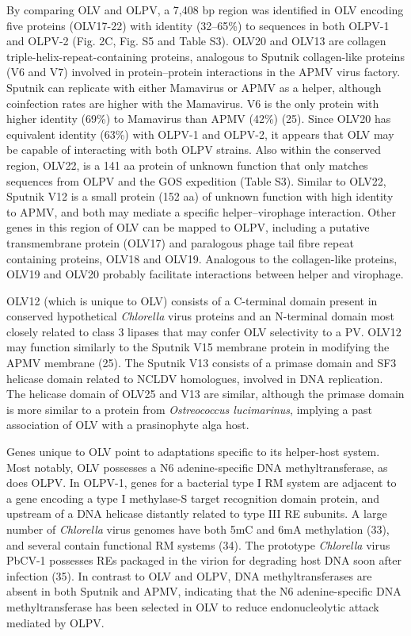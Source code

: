 By comparing \ac{OLV} and \ac{OLPV}, a 7,408 bp region was identified in \ac{OLV} encoding five proteins (OLV17-22) with identity (32--65\%) to sequences in both \ac{OLPV}-1 and \ac{OLPV}-2 (Fig. 2C, Fig. S5 and Table S3). 
OLV20 and OLV13 are collagen triple-helix-repeat-containing proteins, analogous to Sputnik collagen-like proteins (V6 and V7) involved in protein--protein interactions in the \ac{APMV} virus factory. 
Sputnik can replicate with either Mamavirus or \ac{APMV} as a helper, although coinfection rates are higher with the Mamavirus. 
V6 is the only protein with higher identity (69\%) to Mamavirus than \ac{APMV} (42\%) (25). 
Since OLV20 has equivalent identity (63\%) with \ac{OLPV}-1 and \ac{OLPV}-2, it appears that \ac{OLV} may be capable of interacting with both \ac{OLPV} strains. 
Also within the conserved region, OLV22, is a 141 aa protein of unknown function that only matches sequences from \ac{OLPV} and the \ac{GOS} expedition (Table S3). 
Similar to OLV22, Sputnik V12 is a small protein (152 aa) of unknown function with high identity to \ac{APMV}, and both may mediate a specific helper--virophage interaction. 
Other genes in this region of \ac{OLV} can be mapped to \ac{OLPV}, including a putative transmembrane protein (OLV17) and paralogous phage tail fibre repeat containing proteins, OLV18 and OLV19. 
Analogous to the collagen-like proteins, OLV19 and OLV20 probably facilitate interactions between helper and virophage. 

OLV12 (which is unique to \ac{OLV}) consists of a C-terminal domain present in conserved hypothetical \emph{Chlorella} virus proteins and an N-terminal domain most closely related to class 3 lipases that may confer \ac{OLV} selectivity to a \ac{PV}. 
OLV12 may function similarly to the Sputnik V15 membrane protein in modifying the \ac{APMV} membrane (25). 
The Sputnik V13 consists of a primase domain and SF3 helicase domain related to \ac{NCLDV} homologues, involved in \textsc{DNA} replication. 
The helicase domain of OLV25 and V13 are similar, although the primase domain is more similar to a protein from \emph{Ostreococcus lucimarinus}, implying a past association of \ac{OLV} with a prasinophyte alga host. 

Genes unique to \ac{OLV} point to adaptations specific to its helper-host system. 
Most notably, \ac{OLV} possesses a N6 adenine-specific \textsc{DNA} methyltransferase, as does \ac{OLPV}. 
In \ac{OLPV}-1, genes for a bacterial type I \ac{RM} system are adjacent to a gene encoding a type I methylase-S target recognition domain protein, and upstream of a \textsc{DNA} helicase distantly related to type III \ac{RE} subunits. 
A large number of \emph{Chlorella} virus genomes have both 5mC and 6mA methylation (33), and several contain functional \ac{RM} systems (34). 
The prototype \emph{Chlorella} virus PbCV-1 possesses REs packaged in the virion for degrading host \textsc{DNA} soon after infection (35). 
In contrast to \ac{OLV} and \ac{OLPV}, \textsc{DNA} methyltransferases are absent in both Sputnik and \textsc{APMV}, indicating that the N6 adenine-specific \textsc{DNA} methyltransferase has been selected in \ac{OLV} to reduce endonucleolytic attack mediated by \ac{OLPV}. 

